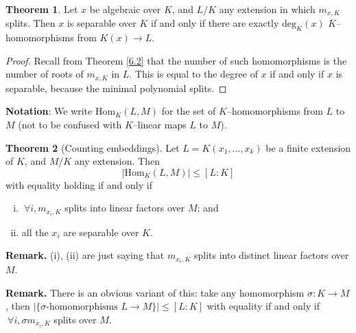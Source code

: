 \documentclass{article}
\theoremstyle{definition}
\newtheorem{theorem}{Theorem}[section]
\begin{document}
\begin{theorem}\label{8.4}
    Let $x$ be algebraic over $K$, and $L/K$ any extension in which $m_{x,K}$ splits. Then $x$ is separable over $K$ if and only if there are exactly $\text{deg}_K(x)$ $K$--homomorphisms from $K(x) \to L$. 
\end{theorem}
\begin{proof}
    Recall from Theorem \ref{6.2} that the number of such homomorphisms is the number of roots of $m_{x,K}$ in $L$. This is equal to the degree of $x$ if and only if $x$ is separable, because the minimal polynomial splits.
\end{proof}


\textbf{Notation}: We write $\text{Hom}_K(L,M)$ for the set of $K$--homomorphisms from $L$ to $M$ (not to be confused with $K$--linear maps $L$ to $M$). 

\begin{theorem}[Counting embeddings]\label{8.5}
    Let $L=K(x_1,\ldots,x_k)$ be a finite extension of $K$, and $M/K$ any extension. Then $$|\text{Hom}_K(L,M)|\le [L : K]$$ with equality holding if and only if 
    \begin{enumerate}[(i)]
        \item $~\forall i, m_{x_i,K}$ splits into linear factors over $M$; and
        \item all the $x_i$ are separable over $K$.
    \end{enumerate}
\end{theorem}
\textbf{Remark.} (i), (ii) are just saying that $m_{x_i,K}$ splits into distinct linear factors over $M$.

\textbf{Remark.} There is an obvious variant of this: take any homomorphism $\sigma : K \to M$, then $|\{\sigma \text{-homomorphisms }L \to M\}| \le [L:K]$ with equality if and only if $~\forall i, \sigma m_{x_i,K}$ splits over $M$. 
\end{document}
